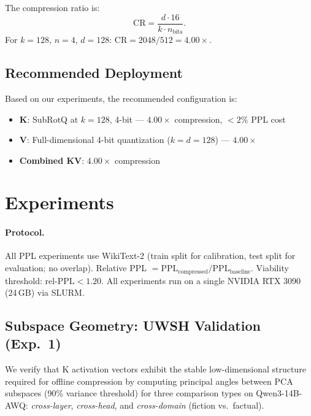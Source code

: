 \documentclass{article}
\newcommand{\relppl}{\text{rel-PPL}}
\begin{document}
The compression ratio is:
\begin{equation}
  \text{CR} = \frac{d \cdot 16}{k \cdot n_\text{bits}}.
  \label{eq:cr}
\end{equation}
For $k{=}128$, $n{=}4$, $d{=}128$: $\text{CR} = 2048/512 = 4.00{\times}$.

\subsection{Recommended Deployment}
\label{sec:deployment}

Based on our experiments, the recommended configuration is:
\begin{itemize}[itemsep=2pt]
  \item \textbf{K}: SubRotQ at $k{=}128$, 4-bit --- $4.00{\times}$ compression, ${<}2\%$ PPL cost
  \item \textbf{V}: Full-dimensional 4-bit quantization ($k{=}d{=}128$) --- $4.00{\times}$
  \item \textbf{Combined KV}: $4.00{\times}$ compression
\end{itemize}

\section{Experiments}
\label{sec:experiments}

\paragraph{Protocol.}
All PPL experiments use WikiText-2 (train split for calibration, test split for
evaluation; no overlap). Relative PPL $= \text{PPL}_\text{compressed} /
\text{PPL}_\text{baseline}$. Viability threshold: $\relppl < 1.20$. All
experiments run on a single NVIDIA RTX 3090 (24\,GB) via SLURM.

\subsection{Subspace Geometry: UWSH Validation (Exp.~1)}
\label{sec:uwsh}

We verify that K activation vectors exhibit the stable low-dimensional structure
required for offline compression by computing principal angles between PCA
subspaces (90\% variance threshold) for three comparison types on Qwen3-14B-AWQ:
\emph{cross-layer}, \emph{cross-head}, and \emph{cross-domain} (fiction vs.\ factual).
\end{document}
